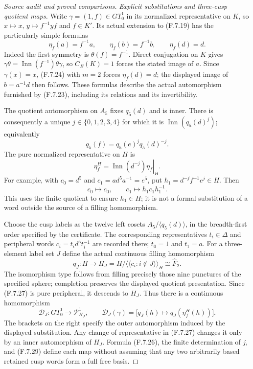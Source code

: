 \begin{proof}[Source audit and proved comparisons]
\emph{Explicit substitutions and three-cusp quotient maps.}
Write $\gamma=(1,f)\in GT_0^1$ in its normalized
representative on $K$, so
$x\mapsto x$, $y\mapsto f^{-1}yf$ and $f\in K'$.
Its actual extension to (F.7.19) has the particularly
simple formulas
\[
          \eta_f(a)=f^{-1}a,\qquad
          \eta_f(b)=f^{-1}b,\qquad \eta_f(d)=d .         \tag{F.7.26}
\]
Indeed the first symmetry is $\theta(f)=f^{-1}$.
Direct conjugation on $K$ gives
$\gamma\theta=\operatorname{Inn}(f^{-1})\theta\gamma$,
so $C_E(K)=1$ forces the stated image of $a$.
Since $\gamma(x)=x$, (F.7.24) with $m=2$ forces
$\eta_f(d)=d$; the displayed image of $b=a^{-1}d$
then follows.  These formulas describe the actual
automorphism furnished by (F.7.23), including its
relations and its invertibility.

The quotient automorphism on $A_5$ fixes $q_5(d)$
and is inner.  There is consequently a unique
$j\in\{0,1,2,3,4\}$ for which it is
$\operatorname{Inn}(q_5(d)^j)$; equivalently
\[
             q_5(f)=q_5(e)^j q_5(d)^{-j}.
\]
The pure normalized representative on $H$ is
\[
       \eta_f^H=
          \left.\operatorname{Inn}(d^{-j})\eta_f\right|_H.
                                                               \tag{F.7.27}
\]
For example, with $c_0=d^5$ and $c_1=a d^5a^{-1}=e^5$,
put $h_1=d^{-j}f^{-1}e^j\in H$.  Then
\[
                 c_0\longmapsto c_0,
        \qquad c_1\longmapsto h_1c_1h_1^{-1}.           \tag{F.7.28}
\]
This uses the finite quotient to ensure $h_1\in H$;
it is not a formal substitution of a word outside
the source of a filling homomorphism.

Choose the cusp labels as the twelve left cosets
$A_5/\langle q_5(d)\rangle$, in the breadth-first
order specified by the certificate.  The corresponding
representatives $t_i\in\Delta$ and peripheral words
$c_i=t_i d^5t_i^{-1}$ are recorded there; $t_0=1$
and $t_1=a$.
For a three-element label set $J$ define the actual
continuous filling homomorphism
\[
 q_J:H\longrightarrow H_J
     =H/\langle\!\langle c_i:i\notin J\rangle\!\rangle_H
                         \cong\widehat F_2.            \tag{F.7.29}
\]
The isomorphism type follows from filling precisely
those nine punctures of the specified sphere;
completion preserves the displayed quotient
presentation.  Since (F.7.27) is pure peripheral,
it descends to $H_J$.  Thus there is a continuous
homomorphism
\[
 \mathcal D_J:GT_0^1\longrightarrow\mathcal P_{H_J}^1,
 \qquad\mathcal D_J(\gamma)=
 \bigl[q_J(h)\longmapsto q_J(\eta_f^H(h))\bigr].       \tag{F.7.30}
\]
The brackets on the right specify the outer
automorphism induced by the displayed substitution.
Any change of representative in (F.7.27) changes
it only by an inner automorphism of $H_J$.
Formula (F.7.26), the finite determination of $j$,
and (F.7.29) define each map without assuming that
any two arbitrarily based retained cusp words
form a full free basis.


\end{proof}
